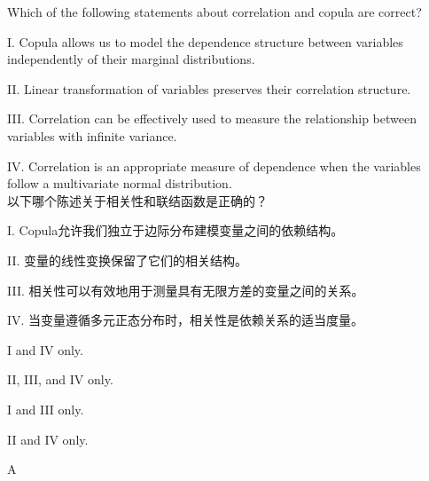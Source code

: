 \documentclass{article}
\newcounter{question} %
\begin{document}
\begin{question}
    Which of the following statements about correlation and copula are correct? 
    
    I. Copula allows us to model the dependence structure between variables independently of their
    marginal distributions. 
    
    II. Linear transformation of variables preserves their correlation
    structure.  
    
    III. Correlation can be effectively used to measure the relationship between variables with
    infinite variance. 
    
    IV. Correlation is an appropriate measure of dependence when the variables follow a multivariate normal distribution.
    \\以下哪个陈述关于相关性和联结函数是正确的？

    I. Copula允许我们独立于边际分布建模变量之间的依赖结构。

    II. 变量的线性变换保留了它们的相关结构。

    III. 相关性可以有效地用于测量具有无限方差的变量之间的关系。

    IV. 当变量遵循多元正态分布时，相关性是依赖关系的适当度量。
\end{question}

\begin{choices}
    \item I and IV only.
    \item II, III, and IV only.
    \item I and III only.
    \item II and IV only.
\end{choices}

\begin{correctanswer}
    A
\end{correctanswer}
\end{document}
